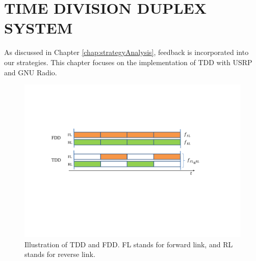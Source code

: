 

%
%

\chapter{TIME DIVISION DUPLEX SYSTEM}
\label{chap:TDD}
As discussed in Chapter \ref{chap:strategyAnalysis}, feedback is incorporated into our strategies. This chapter focuses on the implementation of TDD with USRP and GNU Radio.

\begin{figure}[tpb]
  \begin{center}
    \centerline{\includegraphics[width=140mm]{TDDandFDD.pdf}}
    \caption{Illustration of TDD and FDD. FL stands for forward link, and RL stands for reverse link.}
    \label{fig:TDDandFDD}
  \end{center}
\end{figure}

